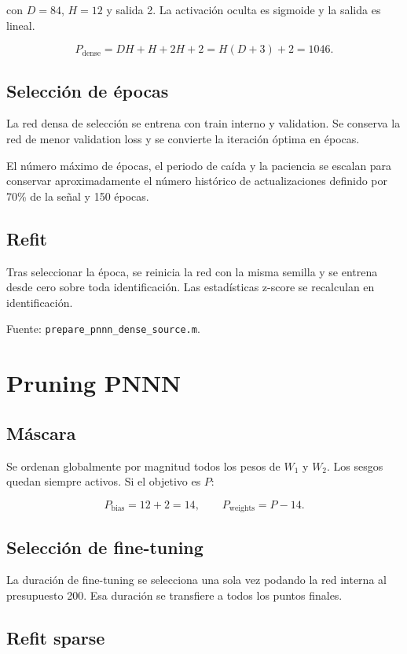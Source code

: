 \documentclass[10pt,a4paper]{article}
\newcommand{\code}[1]{\texttt{#1}}
\begin{document}
con \(D=84\), \(H=12\) y salida 2. La activación oculta es sigmoide y la
salida es lineal.

\[
P_{\mathrm{dense}}
=DH+H+2H+2
=H(D+3)+2
=1046.
\]

\subsection{Selección de épocas}

La red densa de selección se entrena con train interno y validation. Se
conserva la red de menor validation loss y se convierte la iteración óptima en
épocas.

El número máximo de épocas, el periodo de caída y la paciencia se escalan para
conservar aproximadamente el número histórico de actualizaciones definido por
70\% de la señal y 150 épocas.

\subsection{Refit}

Tras seleccionar la época, se reinicia la red con la misma semilla y se
entrena desde cero sobre toda identificación. Las estadísticas z-score se
recalculan en identificación.

Fuente:
\code{prepare\_pnnn\_dense\_source.m}.

\section{Pruning PNNN}

\subsection{Máscara}

Se ordenan globalmente por magnitud todos los pesos de \(W_1\) y \(W_2\). Los
sesgos quedan siempre activos. Si el objetivo es \(P\):

\[
P_{\mathrm{bias}}=12+2=14,
\qquad
P_{\mathrm{weights}}=P-14.
\]

\subsection{Selección de fine-tuning}

La duración de fine-tuning se selecciona una sola vez podando la red interna
al presupuesto 200. Esa duración se transfiere a todos los puntos finales.

\subsection{Refit sparse}
\end{document}
